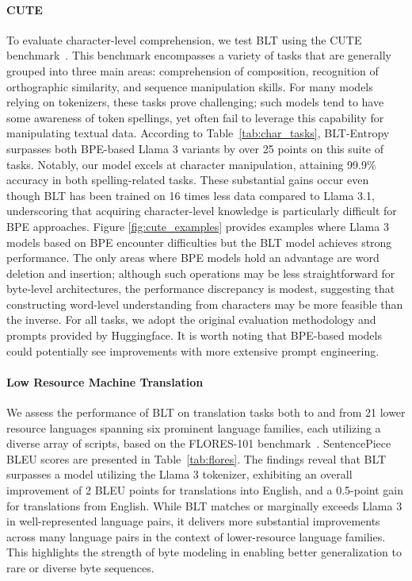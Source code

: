 \paragraph{CUTE}
To evaluate character-level comprehension, we test {\textsc BLT} using the CUTE benchmark~\citep{edman2024cute}. This benchmark encompasses a variety of tasks that are generally grouped into three main areas: comprehension of composition, recognition of orthographic similarity, and sequence manipulation skills. For many models relying on tokenizers, these tasks prove challenging; such models tend to have some awareness of token spellings, yet often fail to leverage this capability for manipulating textual data. According to Table~\ref{tab:char_tasks}, {\textsc BLT}-Entropy surpasses both BPE-based Llama 3 variants by over 25 points on this suite of tasks. Notably, our model excels at character manipulation, attaining 99.9\% accuracy in both spelling-related tasks. These substantial gains occur even though {\textsc BLT} has been trained on 16 times less data compared to Llama 3.1, underscoring that acquiring character-level knowledge is particularly difficult for BPE approaches. Figure \ref{fig:cute_examples} provides examples where Llama 3 models based on BPE encounter difficulties but the {\textsc BLT} model achieves strong performance. The only areas where BPE models hold an advantage are word deletion and insertion; although such operations may be less straightforward for byte-level architectures, the performance discrepancy is modest, suggesting that constructing word-level understanding from characters may be more feasible than the inverse. For all tasks, we adopt the original evaluation methodology and prompts provided by Huggingface. It is worth noting that BPE-based models could potentially see improvements with more extensive prompt engineering.

\paragraph{Low Resource Machine Translation} We assess the performance of {\textsc BLT} on translation tasks both to and from 21 lower resource languages spanning six prominent language families, each utilizing a diverse array of scripts, based on the FLORES-101 benchmark~\citep{goyal2022flores}. SentencePiece BLEU scores are presented in Table~\ref{tab:flores}. The findings reveal that {\textsc BLT} surpasses a model utilizing the Llama 3 tokenizer, exhibiting an overall improvement of 2 BLEU points for translations into English, and a 0.5-point gain for translations from English. While {\textsc BLT} matches or marginally exceeds Llama 3 in well-represented language pairs, it delivers more substantial improvements across many language pairs in the context of lower-resource language families. This highlights the strength of byte modeling in enabling better generalization to rare or diverse byte sequences.

